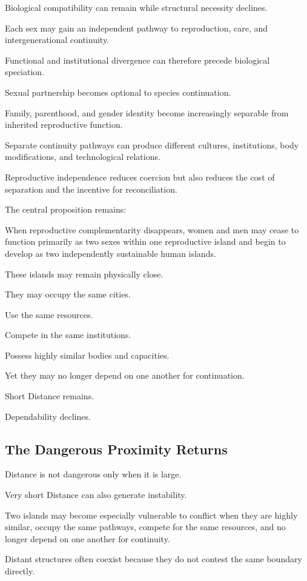 Biological compatibility can remain while structural necessity declines.

Each sex may gain an independent pathway to reproduction, care, and intergenerational continuity.

Functional and institutional divergence can therefore precede biological speciation.

Sexual partnership becomes optional to species continuation.

Family, parenthood, and gender identity become increasingly separable from inherited reproductive function.

Separate continuity pathways can produce different cultures, institutions, body modifications, and technological relations.

Reproductive independence reduces coercion but also reduces the cost of separation and the incentive for reconciliation.

The central proposition remains:

When reproductive complementarity disappears, women and men may cease to function primarily as two sexes within one reproductive island and begin to develop as two independently sustainable human islands.

These islands may remain physically close.

They may occupy the same cities.

Use the same resources.

Compete in the same institutions.

Possess highly similar bodies and capacities.

Yet they may no longer depend on one another for continuation.

Short Distance remains.

Dependability declines.

\subsection*{\textbf{The Dangerous Proximity Returns}} 

Distance is not dangerous only when it is large.

Very short Distance can also generate instability.

Two islands may become especially vulnerable to conflict when they are highly similar, occupy the same pathways, compete for the same resources, and no longer depend on one another for continuity.

Distant structures often coexist because they do not contest the same boundary directly.

